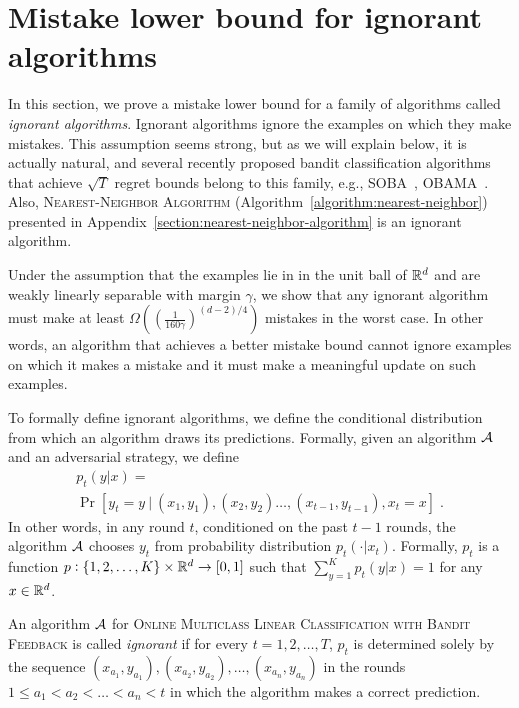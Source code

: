 \section{Mistake lower bound for ignorant algorithms}
\label{section:mistake-lower-bound-for-ignorant-algorithms}

In this section, we prove a mistake lower bound for a family of algorithms
called \textit{ignorant algorithms}. Ignorant algorithms ignore the examples on
which they make mistakes. This assumption seems strong, but as we will explain
below, it is actually natural, and several recently proposed bandit
classification algorithms that achieve $\sqrt{T}$ regret bounds belong to
this family, e.g., SOBA~\citep{Beygelzimer-Orabona-Zhang-2017},
OBAMA~\citep{Foster-Kale-Luo-Mohri-Sridharan-2018}. Also,
\textsc{Nearest-Neighbor Algorithm} (Algorithm~\ref{algorithm:nearest-neighbor})
presented in Appendix~\ref{section:nearest-neighbor-algorithm} is an ignorant
algorithm.

Under the assumption that the examples lie in in the unit ball of $\mathbb{R}^d$ and are
weakly linearly separable with margin $\gamma$, we show that any ignorant
algorithm must make at least $\Omega \left( \left(\frac{1}{160 \gamma}\right)^{(d-2)/4} \right)$
mistakes in the worst case. In other words, an algorithm that achieves a better
mistake bound cannot ignore examples on which it makes a mistake and it must
make a meaningful update on such examples.

To formally define ignorant algorithms, we define the conditional distribution
from which an algorithm draws its predictions. Formally, given an algorithm
$\mathcal{A}$ and an adversarial strategy, we define
\begin{multline*}
p_t(y|x) = \\
\Pr[y_t = y ~|~ (x_1, y_1), (x_2, y_2) \dots, (x_{t-1}, y_{t-1}), x_t = x] \; .
\end{multline*}
In other words, in any round $t$, conditioned on the past $t-1$ rounds, the
algorithm $\mathcal{A}$ chooses $y_t$ from probability distribution $p_t(\cdot|x_t)$.
Formally, $p_t$ is a function $p:\{1,2,\dots,K\} \times \mathbb{R}^d \to [0,1]$
such that $\sum_{y=1}^K p_t(y|x) = 1$ for any $x \in \mathbb{R}^d$.

\begin{definition}
An algorithm $\mathcal{A}$ for \textsc{Online Multiclass Linear Classification with
Bandit Feedback} is called \emph{ignorant} if for every $t=1,2,\dots,T$,
$p_t$ is determined solely by the sequence
$(x_{a_1}, y_{a_1}), (x_{a_2}, y_{a_2}), \dots, (x_{a_n}, y_{a_n})$
in the rounds $1 \le a_1 < a_2 < \dots < a_n < t$ in which
the algorithm makes a correct prediction.
\end{definition}

